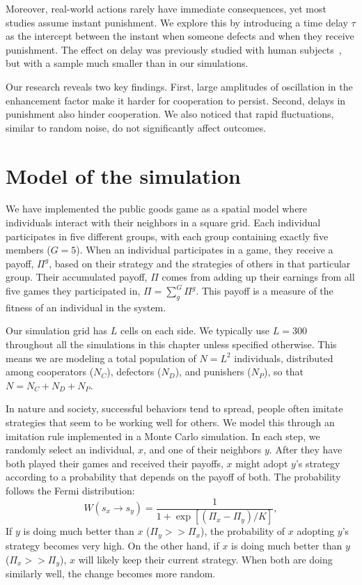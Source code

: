 Moreover, real-world actions rarely have immediate consequences, yet most studies assume instant punishment. We explore this by introducing a time delay $\tau$ as the intercept between the instant when someone defects and when they receive punishment. The effect on delay was previously studied with human subjects~\cite{Late}, but with a sample much smaller than in our simulations.

Our research reveals two key findings. First, large amplitudes of oscillation in the enhancement factor make it harder for cooperation to persist. Second, delays in punishment also hinder cooperation. We also noticed that rapid fluctuations, similar to random noise, do not significantly affect outcomes.



\section{Model of the simulation}
\label{3model}




We have implemented the public goods game as a spatial model where individuals interact with their neighbors in a square grid. Each individual participates in five different groups, with each group containing exactly five members ($G=5$). When an individual participates in a game, they receive a payoff, $\Pi^g$, based on their strategy and the strategies of others in that particular group. Their accumulated payoff, $\Pi$ comes from adding up their earnings from all five games they participated in, $\Pi=\sum_g^G \Pi^g$. This payoff is a measure of the fitness of an individual in the system.

Our simulation grid has $L$ cells on each side. We typically use $L=300$ throughout all the simulations in this chapter unless specified otherwise. This means we are modeling a total population of $N=L^2$ individuals, distributed among cooperators ($N_C$), defectors ($N_D$), and punishers ($N_P$), so that $N=N_C+N_D+N_P$.

In nature and society, successful behaviors tend to spread, people often imitate strategies that seem to be working well for others. We model this through an imitation rule implemented in a Monte Carlo simulation. In each step, we randomly select an individual, $x$, and one of their neighbors $y$. After they have both played their games and received their payoffs, $x$ might adopt $y$'s strategy according to a probability that depends on the payoff of both. The probability follows the Fermi distribution:
\begin{equation}
W(s_x \rightarrow s_y)=\frac{1}{1+\exp[(\Pi_{x}-\Pi_{y})/K]},
\end{equation}
If $y$ is doing much better than $x$ ($\Pi_y >> \Pi_x$), the probability of $x$ adopting $y$'s strategy becomes very high. On the other hand, if $x$ is doing much better than $y$ ($\Pi_x >> \Pi_y$), $x$ will likely keep their current strategy. When both are doing similarly well, the change becomes more random.

